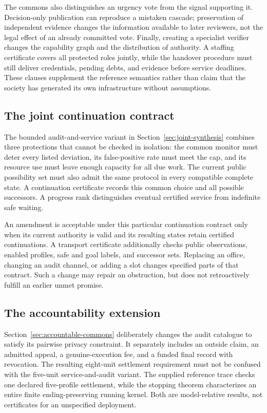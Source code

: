 \documentclass[11pt,letterpaper]{article}
\theoremstyle{plain}
\theoremstyle{definition}
\theoremstyle{remark}
\begin{document}
The commons also distinguishes an urgency vote from the signal supporting it. Decision-only publication can reproduce a mistaken cascade; preservation of independent evidence changes the information available to later reviewers, not the legal effect of an already committed vote. Finally, creating a specialist verifier changes the capability graph and the distribution of authority. A staffing certificate covers all protected roles jointly, while the handover procedure must still deliver credentials, pending debts, and evidence before service deadlines. These clauses supplement the reference semantics rather than claim that the society has generated its own infrastructure without assumptions.

\subsection{The joint continuation contract}
The bounded audit-and-service variant in Section~\ref{sec:joint-synthesis} combines three protections that cannot be checked in isolation: the common monitor must deter every listed deviation, its false-positive rate must meet the cap, and its resource use must leave enough capacity for all due work. The current public possibility set must also admit the same protocol in every compatible complete state. A continuation certificate records this common choice and all possible successors. A progress rank distinguishes eventual certified service from indefinite safe waiting.

An amendment is acceptable under this particular continuation contract only when its current authority is valid and its resulting states retain certified continuations. A transport certificate additionally checks public observations, enabled profiles, safe and goal labels, and successor sets. Replacing an office, changing an audit channel, or adding a slot changes specified parts of that contract. Such a change may repair an obstruction, but does not retroactively fulfill an earlier unmet promise.
\FloatBarrier

\subsection{The accountability extension}
Section~\ref{sec:accountable-commons} deliberately changes the audit catalogue to satisfy its pairwise privacy constraint. It separately includes an outside claim, an admitted appeal, a genuine-execution fee, and a funded final record with revocation. The resulting eight-unit settlement requirement must not be confused with the five-unit service-and-audit variant. The supplied reference trace checks one declared five-profile settlement, while the stopping theorem characterizes an entire finite ending-preserving running kernel. Both are model-relative results, not certificates for an unspecified deployment.
\end{document}
